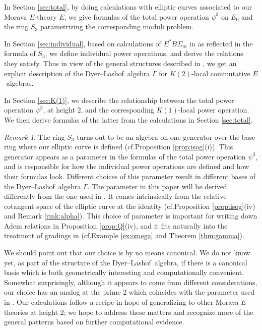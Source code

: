 \documentclass{gtpart}
\theoremstyle{definition}
\theoremstyle{remark}
\newtheorem{rmk}[thm]{Remark}
\newcommand{\cf}{cf.\thinspace}
\newcommand{\DL}{Dyer--Lashof~}
\newcommand{\p}{\psi^3}
\newcommand{\G}{\Gamma}
\begin{document}
In Section \ref{sec:total}, by doing calculations with elliptic curves associated to our Morava $E$-theory $E$, 
we give formulas of the total power operation $\p$ on $E_0$ and the ring $S_3$ parametrizing the corresponding moduli problem.  

In Section \ref{sec:individual}, based on calculations of $E^* B\Sigma_m$ in \cite{Str98} as reflected in the formula of $S_3$, 
we define individual power operations, and derive the relations they satisfy.  
Thus in view of the general structures described in \cite{cong}, 
we get an explicit description of the \DL algebra $\G$ for $K(2)$-local commutative $E$-algebras.  

In Section \ref{sec:K(1)}, we describe the relationship between the total power operation $\p$, at height 2, and the corresponding $K(1)$-local power operation.  
We then derive formulas of the latter from the calculations in Section \ref{sec:total}.  

\begin{rmk}
 The ring $S_3$ turns out to be an algebra on one generator over the base ring where our elliptic curve is defined 
 (\cf Proposition \ref{prop:isog}\thinspace (i)).  This generator appears as a parameter in the formulas of the total power operation $\p$, 
 and is responsible for how the individual power operations are defined and how their formulas look.  
 Different choices of this parameter result in different bases of the \DL algebra $\G$.  
 The parameter in this paper will be derived differently from the one used in \cite{h2p2}.  
 It comes intrinsically from the relative cotangent space of the elliptic curve at the identity 
 (\cf Proposition \ref{prop:isog}\thinspace (iv) and Remark \ref{rmk:alpha}).  
 This choice of parameter is important for writing down Adem relations in Proposition \ref{prop:Q}\thinspace (iv), 
 and it fits naturally into the treatment of gradings in \cite{cong} (\cf Example \ref{ex:omega} and Theorem \ref{thm:gamma}).  

 We should point out that our choice is by no means canonical.  
 We do not know yet, as part of the structure of the \DL algebra, 
 if there is a canonical basis which is both geometrically interesting and computationally convenient.  
 Somewhat surprisingly, although it appears to come from different considerations, 
 our choice has an analog at the prime 2 which coincides with the parameter used in \cite{h2p2}.  
 Our calculations follow a recipe in hope of generalizing to other Morava $E$-theories at height 2; 
 we hope to address these matters and recognize more of the general patterns based on further computational evidence.  
\end{rmk}
\end{document}
